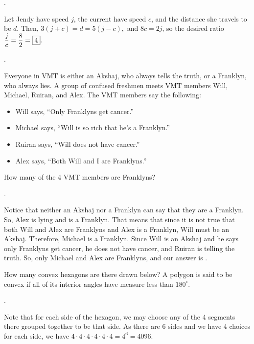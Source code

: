 \documentclass[11pt]{article}
\DeclareRobustCommand{\frac}[3][0pt]{%
  {\begingroup\hspace{#1}#2\hspace{#1}\endgroup\over\hspace{#1}#3\hspace{#1}}}
\begin{document}
.
\begin{solution}
Let Jendy have speed $j$, the current have speed $c$, and the distance she travels to be $d$. Then, $3(j + c) = d = 5(j- c),$ and $8c = 2j$, so the desired ratio $\displaystyle \frac{j}{c} = \frac{8}{2} = \boxed{4}.$
\end{solution}.

\begin{problem}
Everyone in VMT is either an Akshaj, who always tells the truth, or a Franklyn, who always lies. A group of confused freshmen meets VMT members Will, Michael, Ruiran, and Alex. The VMT members say the following:
	\begin{itemize}
    	\item Will says, ``Only Franklyns get cancer.''
    	\item Michael says, ``Will is so rich that he's a Franklyn.''
    	\item Ruiran says, ``Will does not have cancer.''
    	\item Alex says, ``Both Will and I are Franklyns.''
	\end{itemize}
	How many of the 4 VMT members are Franklyns?
\end{problem}

.
\begin{solution}
Notice that neither an Akshaj nor a Franklyn can say that they are a Franklyn. So, Alex is lying and is a Franklyn. That means that since it is not true that both Will and Alex are Franklyns and Alex is a Franklyn, Will must be an Akshaj. Therefore, Michael is a Franklyn. Since Will is an Akshaj and he says only Franklyns get cancer, he does not have cancer, and Ruiran is telling the truth. So, only Michael and Alex are Franklyns, and our answer is .
\end{solution}

\begin{problem} How many convex hexagons are there drawn below? A polygon is said to be convex if all of its interior angles have measure less than $180^{\circ}$. %
\end{problem}

.
\begin{solution}
Note that for each side of the hexagon, we may choose any of the 4 segments there grouped together to be that side. As there are 6 sides and we have 4 choices for each side, we have $4 \cdot 4 \cdot 4 \cdot 4 \cdot 4 \cdot 4 = 4^6 = \boxed{4096}$.
\end{solution}
\end{document}
